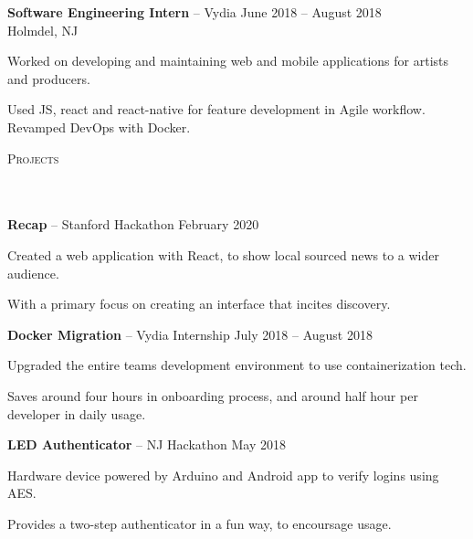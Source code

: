 \documentclass{article}
\newcommand{\header}[1]{{
\hspace*{-15pt}\vspace*{6pt} \textsc{#1}} \vspace*{-6pt} 
\lineunder
}
\newcommand{\lineunder}{
\vspace*{-8pt} \\ \hspace*{-18pt} 
\hrulefill \\
}
\newcommand{\employer}[4]{{
\vspace*{2pt}%
\textbf{#1} #2 \hfill #3\\ #4 \vspace*{2pt}}
}
\newcommand{\project}[3]{{
\vspace*{2pt}%
\textbf{#1} #2 \hfill #3\vspace*{2pt}}
}
\renewcommand{\labelitemii}{
$\vcenter{\hbox{\tiny$\bullet$}}$\hspace*{-3pt}
}
\newenvironment{bullet-list-minor}{
\begin{list}{\labelitemii}{\setlength\leftmargin{15pt} 
\topsep 0pt \itemsep -2pt}}{\vspace*{4pt}\end{list}
}
\begin{document}
    \employer{Software Engineering Intern}{-- Vydia}{June 2018 -- August 2018}{Holmdel, NJ}
	\begin{bullet-list-minor}
	\item Worked on developing and maintaining web and mobile applications for artists and producers.
	\item Used JS, react and react-native for feature development in Agile workflow. Revamped DevOps with Docker. 
    \end{bullet-list-minor}

\vspace*{4pt}%
\header{Projects}


    \project{Recap}{ -- Stanford Hackathon}{February 2020}
    \begin{bullet-list-minor}
    \item Created a web application with React, to show local sourced news to a wider audience. 
    \item With a primary focus on creating an interface that incites discovery. 
    \end{bullet-list-minor}

    \project{Docker Migration}{ -- Vydia Internship}{ July 2018 -- August 2018}
	\begin{bullet-list-minor}
	\item Upgraded the entire teams development environment to use containerization tech. 
    \item Saves around four hours in onboarding process, and around half hour per developer in daily usage.
    \end{bullet-list-minor}

    \project{LED Authenticator}{ -- NJ Hackathon}{ May 2018}
	\begin{bullet-list-minor}
    \item Hardware device powered by Arduino and Android app to verify logins using AES. 
    \item Provides a two-step authenticator in a fun way, to encoursage usage. 
    \end{bullet-list-minor}
\end{document}

